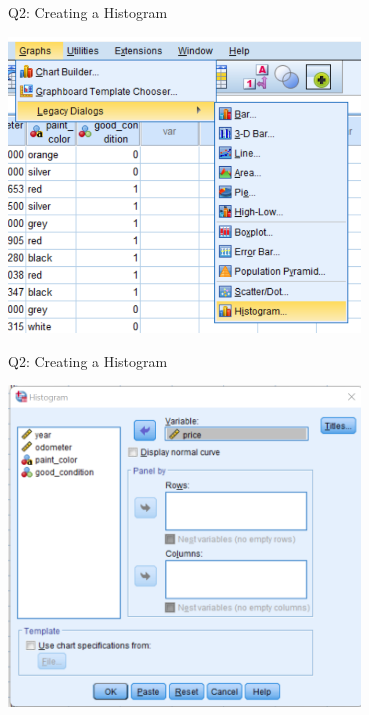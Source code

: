 \documentclass[11pt]{beamer}
\begin{document}
\begin{frame}{Q2: Creating a Histogram}
  \begin{center}
    \includegraphics[width=0.7\textwidth]{f150-graphs-legacy-histogram.png}
  \end{center}
\end{frame}

\begin{frame}{Q2: Creating a Histogram}
  \begin{center}
    \includegraphics[width=0.7\textwidth]{f150-histogram-dialog.png}
  \end{center}
\end{frame}
\end{document}

